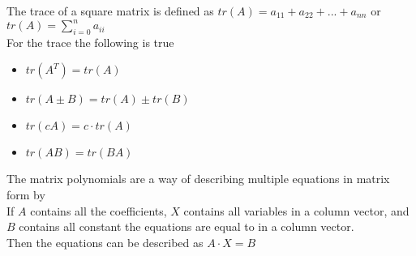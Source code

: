 \documentclass[12pt, a4paper]{article}
\begin{document}
				The trace of a square matrix is defined as $tr(A)=a_{11}+a_{22}+...+a_{nn}$ or $tr(A)=\sum\limits_{i=0}^n a_{ii}$\\
				For the trace the following is true
				\begin{itemize}
					\item $tr(A^T)=tr(A)$
					\item $tr(A\pm B)=tr(A)\pm tr(B)$
					\item $tr(cA)=c\cdot tr(A)$
					\item $tr(AB)=tr(BA)$
				\end{itemize}
				The matrix polynomials are a way of describing multiple equations in matrix form by\\
				If $A$ contains all the coefficients, $X$ contains all variables in a column vector, and $B$ contains all constant the equations are equal to in a column vector.\\
				Then the equations can be described as  $A\cdot X=B$
\end{document}
